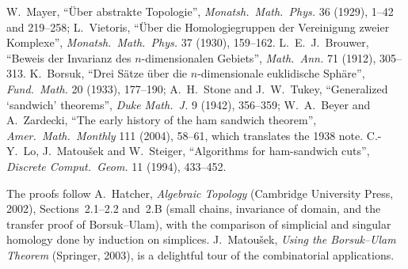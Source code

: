 W.~Mayer, ``\"Uber abstrakte Topologie'', \emph{Monatsh.\ Math.\ Phys.} 36 (1929), 1--42 and 219--258; L.~Vietoris, ``\"Uber die Homologiegruppen der Vereinigung zweier Komplexe'', \emph{Monatsh.\ Math.\ Phys.}
37 (1930), 159--162. L.~E.~J.~Brouwer, ``Beweis der Invarianz des $n$-dimensionalen Gebiets'', \emph{Math.\ Ann.} 71 (1912), 305--313. K.~Borsuk, ``Drei S\"atze \"uber die $n$-dimensionale euklidische Sph\"are'',
\emph{Fund.\ Math.} 20 (1933), 177--190; A.~H.~Stone and J.~W.~Tukey, ``Generalized `sandwich' theorems'', \emph{Duke Math.\ J.} 9 (1942), 356--359; W.~A.~Beyer and A.~Zardecki, ``The early history of the ham sandwich theorem'', \emph{Amer.\ Math.\ Monthly} 111 (2004), 58--61, which translates the 1938 note. C.-Y.~Lo, J.~Matou\v sek and W.~Steiger, ``Algorithms for ham-sandwich cuts'', \emph{Discrete Comput.\ Geom.} 11 (1994), 433--452.

The proofs follow A.~Hatcher, \emph{Algebraic Topology} (Cambridge University Press, 2002), Sections~2.1--2.2 and~2.B (small chains, invariance of domain, and the transfer proof of Borsuk--Ulam),
with the comparison of simplicial and singular homology done by induction on simplices. J.~Matou\v sek, \emph{Using the Borsuk--Ulam Theorem} (Springer, 2003), is a delightful tour of the combinatorial
applications.
